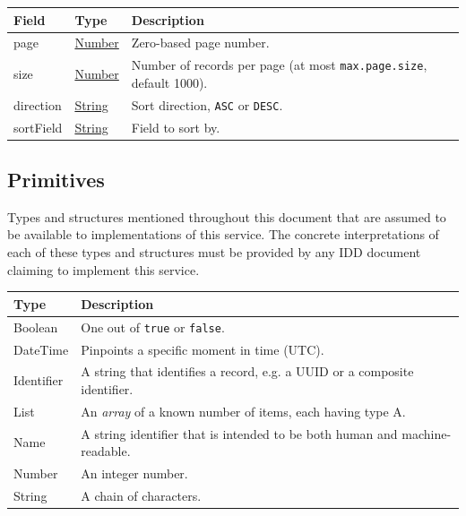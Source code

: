 \documentclass[a4paper]{arrowhead}
\newcommand{\pdef}[1]{{\textcolor{ArrowheadGrey}{#1\label{sec:model:primitives:#1}\label{sec:model:primitives:#1s}\label{sec:model:primitives:#1es}}}}
\newcommand{\pref}[1]{{\textcolor{ArrowheadGrey}{\hyperref[sec:model:primitives:#1]{#1}}}}
\begin{document}
\noindent\begin{tabularx}{\textwidth}{| >{\raggedright\arraybackslash}p{3.9cm} | >{\raggedright\arraybackslash\small}p{5.3cm} | X |} \hline
\rowcolor{gray!33} Field & Type & Description \\ \hline
page & \pref{Number} & Zero-based page number. \\ \hline
size & \pref{Number} & Number of records per page (at most \texttt{max.\allowbreak{}page.\allowbreak{}size}, default 1000). \\ \hline
direction & \pref{String} & Sort direction, \texttt{ASC} or \texttt{DESC}. \\ \hline
sort\allowbreak{}Field & \pref{String} & Field to sort by. \\ \hline
\end{tabularx}



\subsection{Primitives}
\label{sec:model:primitives}

Types and structures mentioned throughout this document that are assumed to be available to implementations of this service.
The concrete interpretations of each of these types and structures must be provided by any IDD document claiming to implement this service.

\noindent\begin{tabularx}{\textwidth}{| p{4.6cm} | X |} \hline
\rowcolor{gray!33} Type & Description \\ \hline
\pdef{Boolean} & One out of \texttt{true} or \texttt{false}. \\ \hline
\pdef{DateTime} & Pinpoints a specific moment in time (UTC). \\ \hline
\pdef{Identifier} & A string that identifies a record, e.g. a UUID or a composite identifier. \\ \hline
\pdef{List} & An \textit{array} of a known number of items, each having type A. \\ \hline
\pdef{Name} & A string identifier that is intended to be both human and machine-readable. \\ \hline
\pdef{Number} & An integer number. \\ \hline
\pdef{String} & A chain of characters. \\ \hline
\end{tabularx}

\newpage
\end{document}
